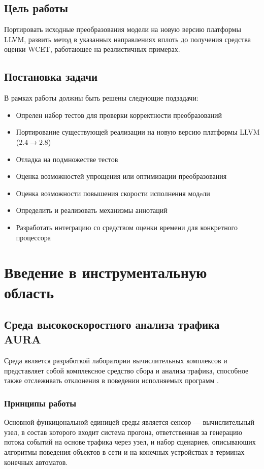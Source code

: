 \documentclass[12pt,a4paper]{article}
\begin{document}
\subsection{Цель работы}
Портировать исходные преобразования модели на новую версию платформы LLVM, развить метод в указанных направлениях вплоть до получения средства оценки WCET, работающее на реалистичных примерах.

\subsection{Постановка задачи}
В рамках работы должны быть решены следующие подзадачи:

\begin{itemize}
\item Опрелен набор тестов для проверки корректности преобразований
\item Портирование существующей реализации на новую версию платформы LLVM ($2.4 \to 2.8$)
\item Отладка на подмножестве тестов
\item Оценка возможностей упрощения или оптимизации преобразования
\item Оценка возможности повышения скорости исполнения модeли
\item Определить и реализовать механизмы аннотаций
\item Разработать интеграцию со средством оценки времени для конкретного процессора
\end{itemize}

\newpage

\section{Введение в инструментальную область}

\subsection{Среда высокоскоростного анализа трафика AURA}
Среда является разработкой лаборатории вычислительных комплексов и представляет собой комплексное средство сбора и анализа трафика, способное также отслеживать отклонения в поведении исполняемых программ \cite{gamajun}.

\subsubsection{Принципы работы}
Основной функицональной единицей среды является сенсор --- вычислительный узел, в состав которого входит система прогона, ответственная за генерацию потока событий на основе трафика через узел, и набор сценариев, описывающих алгоритмы поведения объектов в сети и на конечных устройствах в терминах конечных автоматов.
\end{document}
